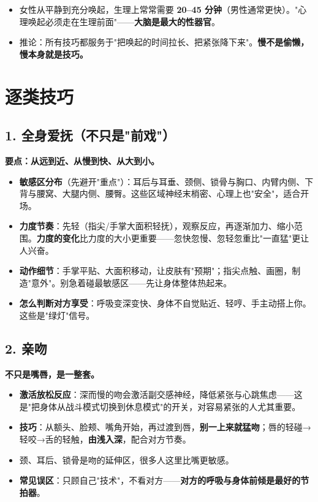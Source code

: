 \documentclass[12pt,UTF8,openany]{ctexbook}
\begin{document}
\begin{itemize}[leftmargin=2em,itemsep=0.3em]
  \item 女性从平静到充分唤起，生理上常常需要 \textbf{20--45 分钟}（男性通常更快）。"心理唤起必须走在生理前面"——\textbf{大脑是最大的性器官}。
  \item 推论：所有技巧都服务于"把唤起的时间拉长、把紧张降下来"。\textbf{慢不是偷懒，慢本身就是技巧。}
\end{itemize}

\section{逐类技巧}

\subsection*{1. 全身爱抚（不只是"前戏"）}

\textbf{要点：从远到近、从慢到快、从大到小。}

\begin{itemize}[leftmargin=2em,itemsep=0.3em]
  \item \textbf{敏感区分布}（先避开"重点"）：耳后与耳垂、颈侧、锁骨与胸口、内臂内侧、下背与腰窝、大腿内侧、腰臀。这些区域神经末梢密、心理上也"安全"，适合开场。
  \item \textbf{力度节奏}：先轻（指尖/手掌大面积轻抚），观察反应，再逐渐加力、缩小范围。\textbf{力度的变化}比力度的大小更重要——忽快忽慢、忽轻忽重比"一直猛"更让人兴奋。
  \item \textbf{动作细节}：手掌平贴、大面积移动，让皮肤有"预期"；指尖点触、画圈，制造"意外"。别急着碰最敏感区——先让身体整体热起来。
  \item \textbf{怎么判断对方享受}：呼吸变深变快、身体不自觉贴近、轻哼、手主动搭上你。这些是"绿灯"信号。
\end{itemize}

\subsection*{2. 亲吻}

\textbf{不只是嘴唇，是一整套。}

\begin{itemize}[leftmargin=2em,itemsep=0.3em]
  \item \textbf{激活放松反应}：深而慢的吻会激活副交感神经，降低紧张与心跳焦虑——这是"把身体从战斗模式切换到休息模式"的开关，对容易紧张的人尤其重要。
  \item \textbf{技巧}：从额头、脸颊、嘴角开始，再过渡到唇，\textbf{别一上来就猛吻}；唇的轻碰→轻咬→舌的轻触，\textbf{由浅入深}，配合对方节奏。
  \item 颈、耳后、锁骨是吻的延伸区，很多人这里比嘴更敏感。
  \item \textbf{常见误区}：只顾自己"技术"，不看对方——\textbf{对方的呼吸与身体前倾是最好的节拍器}。
\end{itemize}
\end{document}
